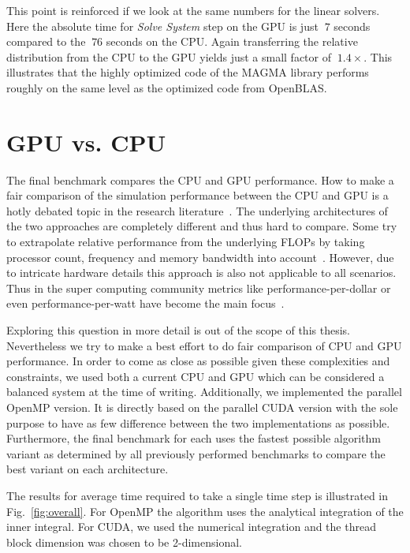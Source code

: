 This point is reinforced if we look at the same numbers for the linear solvers. Here the absolute time for \emph{Solve System} step on the GPU is just $~7$ seconds compared to the $~76$ seconds on the CPU. Again transferring the relative distribution from the CPU to the GPU yields just a small factor of $~1.4×$. This illustrates that the highly optimized code of the MAGMA library performs roughly on the same level as the optimized code from OpenBLAS.

\section{GPU vs. CPU}

The final benchmark compares the CPU and GPU performance. How to make a fair comparison of the simulation performance between the CPU and GPU is a hotly debated topic in the research literature~\cite{Lee2010}\cite{Gregg2011}. The underlying architectures of the two approaches are completely different and thus hard to compare. Some try to extrapolate relative performance from the underlying FLOPs by taking processor count, frequency and memory bandwidth into account~\cite{Lee2010}. However, due to intricate hardware details this approach is also not applicable to all scenarios. Thus in the super computing community metrics like performance-per-dollar or even performance-per-watt have become the main focus~\cite{Kamil2008}.

Exploring this question in more detail is out of the scope of this thesis. Nevertheless we try to make a best effort to do fair comparison of CPU and GPU performance. In order to come as close as possible given these complexities and constraints, we used both a current CPU and GPU which can be considered a balanced system at the time of writing. Additionally, we implemented the parallel OpenMP version. It is directly based on the parallel CUDA version with the sole purpose to have as few difference between the two implementations as possible. Furthermore, the final benchmark for each uses the fastest possible algorithm variant as determined by all previously performed benchmarks to compare the best variant on each architecture.

The results for average time required to take a single time step is illustrated in Fig.~\ref{fig:overall}. For OpenMP the algorithm uses the analytical integration of the inner integral. For CUDA, we used the numerical integration and the thread block dimension was chosen to be 2-dimensional.

